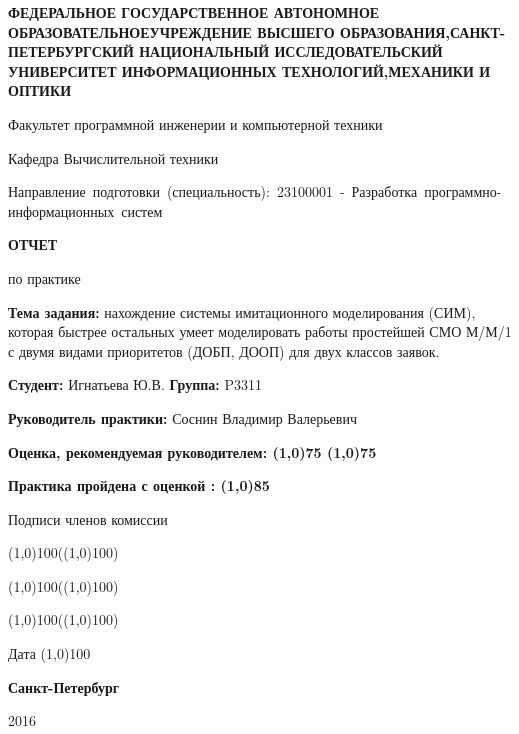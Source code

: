 \begin{titlepage}

\begin{center}   
{\bfseries  
ФЕДЕРАЛЬНОЕ ГОСУДАРСТВЕННОЕ АВТОНОМНОЕ ОБРАЗОВАТЕЛЬНОЕУЧРЕЖДЕНИЕ ВЫСШЕГО ОБРАЗОВАНИЯ,САНКТ-ПЕТЕРБУРГСКИЙ НАЦИОНАЛЬНЫЙ ИССЛЕДОВАТЕЛЬСКИЙ УНИВЕРСИТЕТ ИНФОРМАЦИОННЫХ ТЕХНОЛОГИЙ,МЕХАНИКИ И ОПТИКИ
\par\smallskip
Факультет программной инженерии и компьютерной техники
\par\smallskip
Кафедра Вычислительной техники\\
}
\par\smallskip
\mbox{Направление подготовки (специальность): 23100001 - Разработка программно-информационных систем}

\vspace{3cm} 
{\bfseries
ОТЧЕТ 
\par\medskip
по практике
}
\end{center}  

\par\noindent \smallskip
{\bfseries Тема задания:} нахождение системы имитационного моделирования (СИМ), которая быстрее остальных умеет моделировать работы простейшей СМО М/М/1 с двумя видами приоритетов (ДОБП, ДООП) для двух классов заявок.
\par\noindent \smallskip
{\bfseries Студент: } Игнатьева Ю.В. {\bfseries Группа: } P3311
\par\noindent \smallskip
{\bfseries Руководитель практики: } Соснин Владимир Валерьевич
\par\noindent \smallskip
{\bfseries Оценка, рекомендуемая руководителем: \line(1,0){75} \quad \line(1,0){75}}
\vspace{1cm}

\parindent=8cm
{\bfseries Практика пройдена с оценкой : \line(1,0){85} \par \bigskip
Подписи членов комиссии \par \bigskip

\begin{flushright}  
\line(1,0){100}(\line(1,0){100}) \par \bigskip
\line(1,0){100}(\line(1,0){100}) \par \bigskip
\line(1,0){100}(\line(1,0){100}) \par \bigskip
\end{flushright} 

\parindent=8cm
Дата \line(1,0){100} }
\vspace{\fill}
\begin{center}  
\bfseries Санкт-Петербург \par 2016
\end{center} 

\end{titlepage}